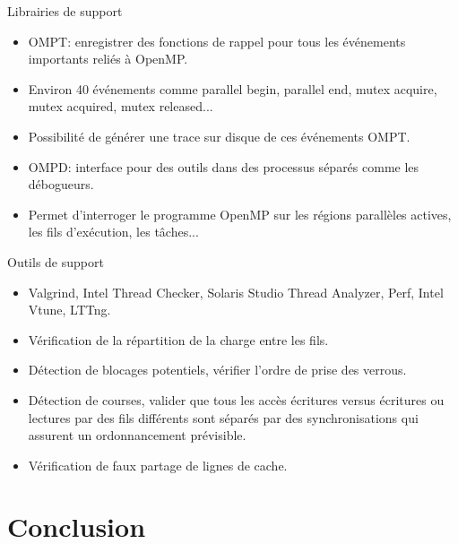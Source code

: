 \documentclass[10pt]{beamer}
\begin{document}
\begin{frame}{Librairies de support}

  \begin{itemize}
    \item OMPT: enregistrer des fonctions de rappel pour tous les événements importants reliés à OpenMP.
    
    \item Environ 40 événements comme parallel begin, parallel end, mutex acquire, mutex acquired, mutex released... 

    \item Possibilité de générer une trace sur disque de ces événements OMPT.

    \item OMPD: interface pour des outils dans des processus séparés comme les débogueurs.

    \item Permet d'interroger le programme OpenMP sur les régions parallèles actives, les fils d'exécution, les tâches...

  \end{itemize}
\end{frame}

\begin{frame}{Outils de support}

  \begin{itemize}
    \item Valgrind, Intel Thread Checker, Solaris Studio Thread Analyzer, Perf, Intel Vtune, LTTng.

    \item Vérification de la répartition de la charge entre les fils.

    \item Détection de blocages potentiels, vérifier l'ordre de prise des verrous.

    \item Détection de courses, valider que tous les accès écritures versus écritures ou lectures par des fils différents sont séparés par des synchronisations qui assurent un ordonnancement prévisible.

    \item Vérification de faux partage de lignes de cache.
  \end{itemize}
\end{frame}

\section{Conclusion}
\end{document}
